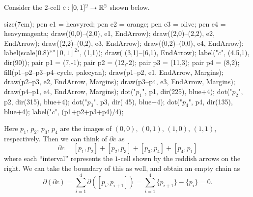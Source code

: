 \begin{example}
	Consider the $2$-cell $c : [0,1]^2 \to \mathbb R^2$ shown below.
	\begin{center}
		\begin{asy}
			size(7cm);
			pen e1 = heavyred;
			pen e2 = orange;
			pen e3 = olive;
			pen e4 = heavymagenta;
			draw((0,0)--(2,0), e1, EndArrow);
			draw((2,0)--(2,2), e2, EndArrow);
			draw((2,2)--(0,2), e3, EndArrow);
			draw((0,2)--(0,0), e4, EndArrow);
			label(scale(0.8)*"$[0,1]^2$", (1,1));
			draw( (3,1)--(6,1), EndArrow);
			label("$c$", (4.5,1), dir(90));
			pair p1 = (7,-1);
			pair p2 = (12,-2);
			pair p3 = (11,3);
			pair p4 = (8,2);
			fill(p1--p2--p3--p4--cycle, palecyan);
			draw(p1--p2, e1, EndArrow, Margins);
			draw(p2--p3, e2, EndArrow, Margins);
			draw(p3--p4, e3, EndArrow, Margins);
			draw(p4--p1, e4, EndArrow, Margins);
			dot("$p_1$", p1, dir(225), blue+4);
			dot("$p_2$", p2, dir(315), blue+4);
			dot("$p_3$", p3, dir( 45), blue+4);
			dot("$p_4$", p4, dir(135), blue+4);
			label("$c$", (p1+p2+p3+p4)/4);
		\end{asy}
	\end{center}
	Here $p_1$, $p_2$, $p_3$, $p_4$ are the images of $(0,0)$, $(0,1)$, $(1,0)$, $(1,1)$, respectively.
	Then we can think of $\partial c$ as
	\[ \partial c = [p_1,p_2] + [p_2,p_3] + [p_3,p_4] + [p_4,p_1] \]
where each ``interval'' represents the $1$-cell shown by the reddish arrows on the right.
	We can take the boundary of this as well, and obtain an empty chain as
	\[ \partial(\partial c) = \sum_{i=1}^4 \partial([p_i, p_{i+1}]) = \sum_{i=1}^4 \{p_{i+1}\}-\{p_i\} = 0. \]
\end{example}

